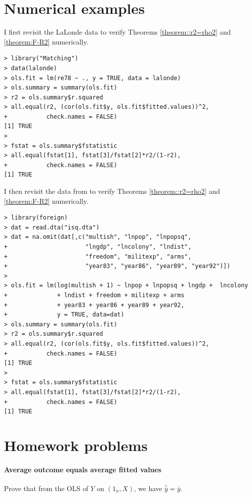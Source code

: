 \section{Numerical examples}

I first revisit the LaLonde data to verify Theorems \ref{theorem::r2=rho2} and \ref{theorem:F-R2} numerically. 
\begin{lstlisting}
> library("Matching")
> data(lalonde)
> ols.fit = lm(re78 ~ ., y = TRUE, data = lalonde)
> ols.summary = summary(ols.fit)
> r2 = ols.summary$r.squared
> all.equal(r2, (cor(ols.fit$y, ols.fit$fitted.values))^2,
+           check.names = FALSE)
[1] TRUE
> 
> fstat = ols.summary$fstatistic
> all.equal(fstat[1], fstat[3]/fstat[2]*r2/(1-r2),
+           check.names = FALSE)
[1] TRUE
\end{lstlisting}    


I then revisit the data from \citet{king2015robust} to verify Theorems \ref{theorem::r2=rho2} and \ref{theorem:F-R2} numerically. 
\begin{lstlisting}
> library(foreign)
> dat = read.dta("isq.dta")
> dat = na.omit(dat[,c("multish", "lnpop", "lnpopsq", 
+                      "lngdp", "lncolony", "lndist", 
+                      "freedom", "militexp", "arms", 
+                      "year83", "year86", "year89", "year92")])
> 
> ols.fit = lm(log(multish + 1) ~ lnpop + lnpopsq + lngdp +  lncolony 
+              + lndist + freedom + militexp + arms 
+              + year83 + year86 + year89 + year92, 
+              y = TRUE, data=dat)
> ols.summary = summary(ols.fit)
> r2 = ols.summary$r.squared
> all.equal(r2, (cor(ols.fit$y, ols.fit$fitted.values))^2,
+           check.names = FALSE)
[1] TRUE
> 
> fstat = ols.summary$fstatistic
> all.equal(fstat[1], fstat[3]/fstat[2]*r2/(1-r2),
+           check.names = FALSE)
[1] TRUE
\end{lstlisting}    
    
     

\section{Homework problems}

\paragraph{Average outcome equals average fitted values}\label{hw09::averagey-averagefitted}

Prove that from the OLS of $Y$ on $(1_n, X)$, we have $\bar{\hat{y}}  = \bar{y}$.



